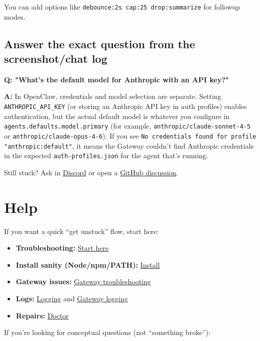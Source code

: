 You can add options like \texttt{debounce:2s cap:25 drop:summarize} for followup modes.

\subsection{Answer the exact question from the screenshot/chat log}


\textbf{Q: "What's the default model for Anthropic with an API key?"}

\textbf{A:} In OpenClaw, credentials and model selection are separate. Setting \texttt{ANTHROPIC\_API\_KEY} (or storing an Anthropic API key in auth profiles) enables authentication, but the actual default model is whatever you configure in \texttt{agents.defaults.model.primary} (for example, \texttt{anthropic/claude-sonnet-4-5} or \texttt{anthropic/claude-opus-4-6}). If you see \texttt{No credentials found for profile "anthropic:default"}, it means the Gateway couldn't find Anthropic credentials in the expected \texttt{auth-profiles.json} for the agent that's running.

\hrulefill


Still stuck? Ask in \href{https://discord.com/invite/clawd}{Discord} or open a \href{https://github.com/openclaw/openclaw/discussions}{GitHub discussion}.


\clearpage

\section{Help}


If you want a quick “get unstuck” flow, start here:

\begin{itemize}
  \item \textbf{Troubleshooting:} \href{/help/troubleshooting}{Start here}
  \item \textbf{Install sanity (Node/npm/PATH):} \href{/install\#nodejs--npm-path-sanity}{Install}
  \item \textbf{Gateway issues:} \href{/gateway/troubleshooting}{Gateway troubleshooting}
  \item \textbf{Logs:} \href{/logging}{Logging} and \href{/gateway/logging}{Gateway logging}
  \item \textbf{Repairs:} \href{/gateway/doctor}{Doctor}
\end{itemize}


If you’re looking for conceptual questions (not “something broke”):

